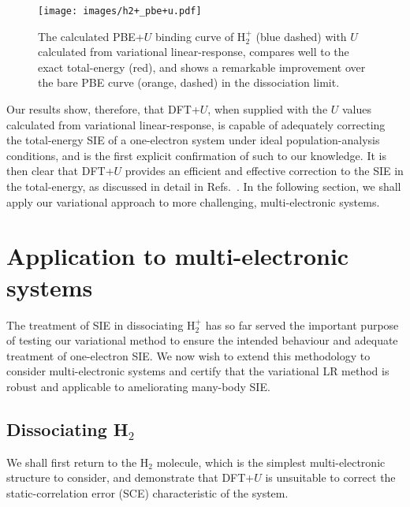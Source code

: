 \begin{figure}[th!]
\centering
\texttt{[image: images/h2+\_pbe+u.pdf]}
\caption[PBE+$U$ binding curve of H$_2^+$ with linear-response $U$]
{The calculated PBE+$U$ binding curve of H$_2^+$ (blue dashed)
with $U$ calculated from variational linear-response, 
compares well to the exact total-energy (red), 
and shows a remarkable improvement over the bare PBE curve (orange, dashed) 
in the dissociation limit.}
\label{fig:h2+_pbe+u}
\end{figure}
% 
%


Our results show, therefore, 
that DFT+$U$, 
when supplied with the $U$ values calculated from 
variational linear-response, 
is capable of adequately correcting 
the total-energy SIE of a one-electron system 
under ideal population-analysis conditions, 
and is the first explicit confirmation  
of such to our knowledge.
%
It is then clear that DFT+$U$ 
provides an efficient and effective correction to the
SIE in the total-energy, 
as discussed in detail in 
Refs.~\cite{PhysRevLett.97.103001,:/content/aip/journal/jcp/133/11/10.1063/1.3489110,:/content/aip/journal/jcp/145/5/10.1063/1.4959882}.
%
In the following section, 
we shall apply our variational approach 
to more challenging, multi-electronic systems.

\section{Application to multi-electronic systems}

The treatment of SIE in dissociating H$_2^+$ 
has so far served the important purpose
of testing our variational method 
to ensure the intended behaviour 
and adequate treatment of one-electron SIE.
%
We now wish to extend this methodology  
to consider multi-electronic systems 
and certify that the variational LR method 
is robust and applicable to ameliorating many-body SIE.
%

\subsection{Dissociating H$_2$}

We shall first return to the H$_2$ molecule, 
which is the simplest multi-electronic structure to consider, 
and demonstrate that DFT+$U$ is unsuitable 
to correct the static-correlation error (SCE) 
characteristic of the system.

